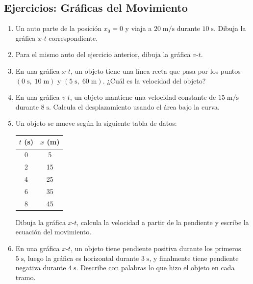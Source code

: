\documentclass[12pt, a4paper]{article}
\begin{document}
\newpage

\subsection{Ejercicios: Gráficas del Movimiento}

\begin{enumerate}[leftmargin=*, resume]
  \item \facil{} Un auto parte de la posición $x_0 = 0$ y viaja a $20\;\text{m/s}$ durante $10\;\text{s}$. Dibuja la gráfica $x$-$t$ correspondiente.

  \item \facil{} Para el mismo auto del ejercicio anterior, dibuja la gráfica $v$-$t$.

  \item \facil{} En una gráfica $x$-$t$, un objeto tiene una línea recta que pasa por los puntos $(0\;\text{s},\; 10\;\text{m})$ y $(5\;\text{s},\; 60\;\text{m})$. ¿Cuál es la velocidad del objeto?

  \item \facil{} En una gráfica $v$-$t$, un objeto mantiene una velocidad constante de $15\;\text{m/s}$ durante $8\;\text{s}$. Calcula el desplazamiento usando el área bajo la curva.

  \item \medio{} Un objeto se mueve según la siguiente tabla de datos:
  \begin{center}
  \begin{tabular}{c|c}
  $t$ (s) & $x$ (m) \\
  \hline
  0 & 5 \\
  2 & 15 \\
  4 & 25 \\
  6 & 35 \\
  8 & 45 \\
  \end{tabular}
  \end{center}
  Dibuja la gráfica $x$-$t$, calcula la velocidad a partir de la pendiente y escribe la ecuación del movimiento.

  \item \medio{} En una gráfica $x$-$t$, un objeto tiene pendiente positiva durante los primeros $5\;\text{s}$, luego la gráfica es horizontal durante $3\;\text{s}$, y finalmente tiene pendiente negativa durante $4\;\text{s}$. Describe con palabras lo que hizo el objeto en cada tramo.


\end{enumerate}
\end{document}
